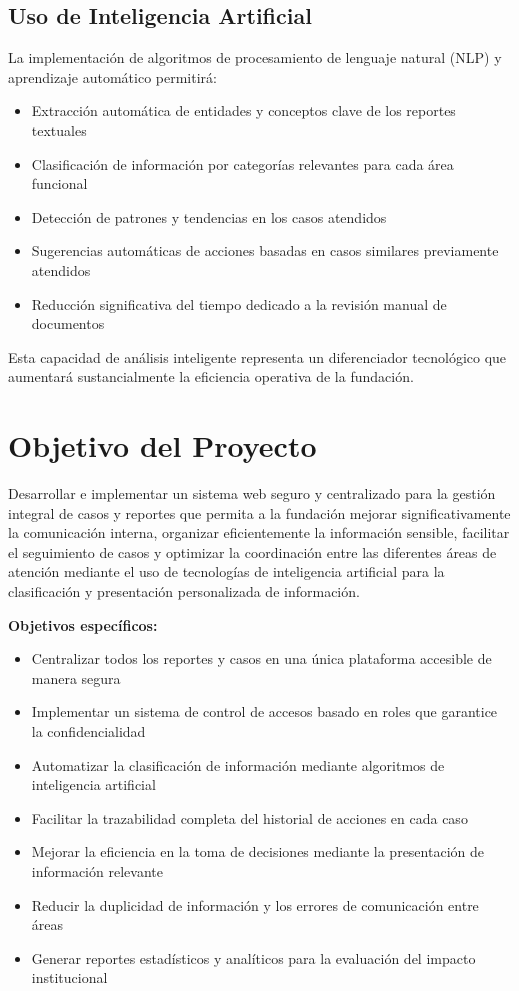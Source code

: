 \documentclass[12pt,letterpaper]{article}
\begin{document}
\subsection{Uso de Inteligencia Artificial}

La implementación de algoritmos de procesamiento de lenguaje natural (NLP) y aprendizaje automático permitirá:

\begin{itemize}
    \item Extracción automática de entidades y conceptos clave de los reportes textuales
    \item Clasificación de información por categorías relevantes para cada área funcional
    \item Detección de patrones y tendencias en los casos atendidos
    \item Sugerencias automáticas de acciones basadas en casos similares previamente atendidos
    \item Reducción significativa del tiempo dedicado a la revisión manual de documentos
\end{itemize}

Esta capacidad de análisis inteligente representa un diferenciador tecnológico que aumentará sustancialmente la eficiencia operativa de la fundación.

\newpage

\section{Objetivo del Proyecto}

Desarrollar e implementar un sistema web seguro y centralizado para la gestión integral de casos y reportes que permita a la fundación mejorar significativamente la comunicación interna, organizar eficientemente la información sensible, facilitar el seguimiento de casos y optimizar la coordinación entre las diferentes áreas de atención mediante el uso de tecnologías de inteligencia artificial para la clasificación y presentación personalizada de información.

\textbf{Objetivos específicos:}

\begin{itemize}
    \item Centralizar todos los reportes y casos en una única plataforma accesible de manera segura
    \item Implementar un sistema de control de accesos basado en roles que garantice la confidencialidad
    \item Automatizar la clasificación de información mediante algoritmos de inteligencia artificial
    \item Facilitar la trazabilidad completa del historial de acciones en cada caso
    \item Mejorar la eficiencia en la toma de decisiones mediante la presentación de información relevante
    \item Reducir la duplicidad de información y los errores de comunicación entre áreas
    \item Generar reportes estadísticos y analíticos para la evaluación del impacto institucional
\end{itemize}
\end{document}
